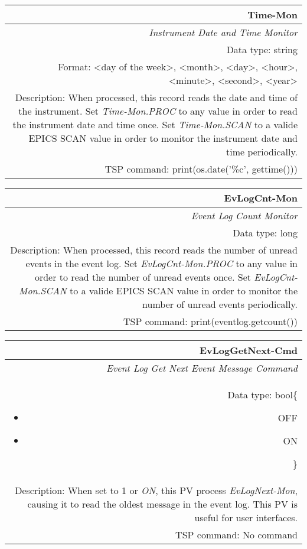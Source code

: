 \documentclass[openany]{article}
\begin{document}
		\begin{tabular}{N}
			\hline
			\bfseries Time-Mon\label{pv:time-mon} \\ \hline
			\emph{Instrument Date and Time Monitor} \\
			Data type: string \\
			Format: \textless day of the week\textgreater, \textless month\textgreater, \textless day\textgreater, \textless hour\textgreater, \textless minute\textgreater, \textless second\textgreater, \textless year\textgreater \\
			Description: When processed, this record reads the date and time of the instrument. Set \emph{Time-Mon.PROC} to any value in order to read the instrument date and time once. Set \emph{Time-Mon.SCAN} to a valide EPICS SCAN value in order to monitor the instrument date and time periodically. \\
			TSP command: print(os.date('\%c', gettime()))
		\end{tabular}

		\begin{tabular}{N}
			\hline
			\bfseries EvLogCnt-Mon\label{pv:evlogcount-mon} \\ \hline
			\emph{Event Log Count Monitor} \\
			Data type: long \\
			Description: When processed, this record reads the number of unread events in the event log. Set \emph{EvLogCnt-Mon.PROC} to any value in order to read the number of unread events once. Set \emph{EvLogCnt-Mon.SCAN} to a valide EPICS SCAN value in order to monitor the number of unread events periodically. \\
			TSP command: print(eventlog.getcount())
		\end{tabular}

		\begin{tabular}{N}
			\hline
			\bfseries EvLogGetNext-Cmd\label{pv:evloggetnext-mon} \\ \hline
			\emph{Event Log Get Next Event Message Command} \\
			Data type: bool\{\begin{itemize}[noitemsep]
				\small
				\item[] OFF
				\item[] ON
			\end{itemize}\} \\
			Description: When set to 1 or \emph{ON}, this PV process \emph{EvLogNext-Mon}, causing it to read the oldest message in the event log. This PV is useful for user interfaces. \\
			TSP command: No command
		\end{tabular}
\end{document}
